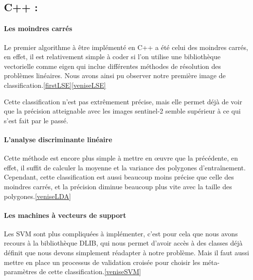 \documentclass[a4paper,10pt]{report}
\begin{document}
\begin{multicols}{2}
\section{C++ :}
\paragraph{Les moindres carrés}
Le premier algorithme à être implémenté en C++ a été celui des moindres carrés, en effet, il est relativement simple à coder si l'on utilise une bibliothèque vectorielle comme eigen qui inclue différentes méthodes de résolution des problèmes linéaires. Nous avons ainsi pu observer notre première image de classification.\ref{firstLSE}\ref{veniseLSE}

Cette classification n'est pas extrêmement précise, mais elle permet déjà de voir que la précision atteignable avec les images sentinel-2 semble supérieur à ce qui s'est fait par le passé.
\paragraph{L'analyse discriminante linéaire}
Cette méthode est encore plus simple à mettre en \oe{}uvre que la précédente, en effet, il suffit de calculer la moyenne et la variance des polygones d'entraînement. Cependant, cette classification est aussi beaucoup moins précise que celle des moindres carrés, et la précision diminue beaucoup plus vite avec la taille des polygones.\ref{veniseLDA}
\paragraph{Les machines à vecteurs de support}
Les SVM sont plus compliquées à implémenter, c'est pour cela que nous avons recours à la bibliothèque DLIB, qui nous permet d'avoir accès à des classes déjà définit que nous devons simplement réadapter à notre problème. Mais il faut aussi mettre en place un processus de validation croisée pour choisir les méta-paramètres de cette classification.\ref{veniseSVM}
\end{multicols}


\end{document}
